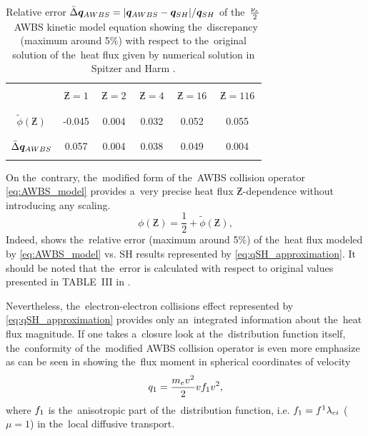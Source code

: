\begin{table}
\begin{center}
  \begin{tabular}{c|ccccc}
    \hline\hline\\
    & $\,\Zbar=1\,$ & $\,\Zbar=2\,$ & $\,\Zbar=4\,$ & $\,\Zbar=16\,$ & $\,\Zbar=116\,$ \\\\
    \hline\\
    $\tilde{\phi}(\Zbar)$ & -0.045 & 0.004 & 0.032 & 0.052 & 0.055 \\\\
    \hline\\
    $\bar{\Delta}\boldsymbol{q}_{AWBS}$ & 0.057 & 0.004 & 0.038 & 0.049 & 0.004 \\\\
    \hline\hline
  \end{tabular}
  \caption{
  Relative error $\bar{\Delta}\boldsymbol{q}_{AWBS} = 
  |\boldsymbol{q}_{AWBS} - \boldsymbol{q}_{SH}| / \boldsymbol{q}_{SH}$ of 
  the~$\frac{\nu_{e}}{2}$~AWBS
  kinetic model equation  showing the~discrepancy 
  (maximum around 5$\%$) with respect to the~original solution of 
  the~heat flux given by numerical solution in Spitzer and Harm 
  \cite{SpitzerHarm_PR1953}.
  }
\label{tab:qAWBS}
\end{center}
\end{table}

On the~contrary, the~modified form of the~AWBS collision operator 
\eqref{eq:AWBS_model} provides a~very precise heat flux $\Zbar$-dependence
without introducing any scaling. 
\begin{equation}
  \phi(\Zbar) = \frac{1}{2} + \tilde{\phi}(\Zbar) ,
  \nonumber
\end{equation}
Indeed,  shows the~relative
error (maximum around 5$\%$) of the~heat flux modeled by 
\eqref{eq:AWBS_model} vs. SH results represented by 
\eqref{eq:qSH_approximation}. It should be noted that the~error is calculated 
with respect to original values presented in TABLE~III in 
\cite{SpitzerHarm_PR1953}.

Nevertheless, the~electron-electron collisions effect represented by 
\eqref{eq:qSH_approximation} provides only an~integrated information about
the~heat flux magnitude. If one takes a~closure look at the~distribution
function itself, the~conformity of the~modified AWBS collision operator
is even more emphasize as can be seen in  showing
the~flux moment in spherical coordinates of velocity
\begin{equation}
  q_1 = \frac{m_ev^2}{2}v f_1 v^2 ,
  \nonumber
\end{equation}
where $f_1$ is the~anisotropic part of the~distribution function, i.e.
$f_1 = f^1\lambda_{ei}$ ($\mu=1$) in the~local diffusive transport.

